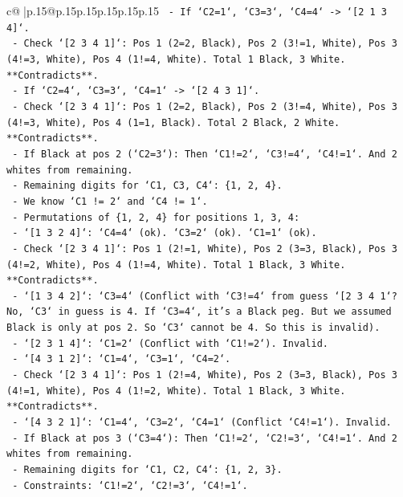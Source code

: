 \documentclass{article}
\begin{document}
{\begin{supertabular}{c@{$\;$}|p{.15\linewidth}@{}p{.15\linewidth}p{.15\linewidth}p{.15\linewidth}p{.15\linewidth}p{.15\linewidth}}
{{{\texttt{      {-} If `C2=1`, `C3=3`, `C4=4` {-}> `{[}2 1 3 4{]}`.} \\
\texttt{        {-} Check `{[}2 3 4 1{]}`: Pos 1 (2=2, Black), Pos 2 (3!=1, White), Pos 3 (4!=3, White), Pos 4 (1!=4, White). Total 1 Black, 3 White. **Contradicts**.} \\
\texttt{      {-} If `C2=4`, `C3=3`, `C4=1` {-}> `{[}2 4 3 1{]}`.} \\
\texttt{        {-} Check `{[}2 3 4 1{]}`: Pos 1 (2=2, Black), Pos 2 (3!=4, White), Pos 3 (4!=3, White), Pos 4 (1=1, Black). Total 2 Black, 2 White. **Contradicts**.} \\
\texttt{    {-} If Black at pos 2 (`C2=3`): Then `C1!=2`, `C3!=4`, `C4!=1`. And 2 whites from remaining.} \\
\texttt{      {-} Remaining digits for `C1, C3, C4`: \{1, 2, 4\}.} \\
\texttt{      {-} We know `C1 != 2` and `C4 != 1`.} \\
\texttt{      {-} Permutations of \{1, 2, 4\} for positions 1, 3, 4:} \\
\texttt{        {-} `{[}1 3 2 4{]}`: `C4=4` (ok). `C3=2` (ok). `C1=1` (ok).} \\
\texttt{          {-} Check `{[}2 3 4 1{]}`: Pos 1 (2!=1, White), Pos 2 (3=3, Black), Pos 3 (4!=2, White), Pos 4 (1!=4, White). Total 1 Black, 3 White. **Contradicts**.} \\
\texttt{        {-} `{[}1 3 4 2{]}`: `C3=4` (Conflict with `C3!=4` from guess `{[}2 3 4 1`? No, `C3` in guess is 4. If `C3=4`, it's a Black peg. But we assumed Black is only at pos 2. So `C3` cannot be 4. So this is invalid).} \\
\texttt{        {-} `{[}2 3 1 4{]}`: `C1=2` (Conflict with `C1!=2`). Invalid.} \\
\texttt{        {-} `{[}4 3 1 2{]}`: `C1=4`, `C3=1`, `C4=2`.} \\
\texttt{          {-} Check `{[}2 3 4 1{]}`: Pos 1 (2!=4, White), Pos 2 (3=3, Black), Pos 3 (4!=1, White), Pos 4 (1!=2, White). Total 1 Black, 3 White. **Contradicts**.} \\
\texttt{        {-} `{[}4 3 2 1{]}`: `C1=4`, `C3=2`, `C4=1` (Conflict `C4!=1`). Invalid.} \\
\texttt{    {-} If Black at pos 3 (`C3=4`): Then `C1!=2`, `C2!=3`, `C4!=1`. And 2 whites from remaining.} \\
\texttt{      {-} Remaining digits for `C1, C2, C4`: \{1, 2, 3\}.} \\
\texttt{      {-} Constraints: `C1!=2`, `C2!=3`, `C4!=1`.} \\
}}}
\end{supertabular}}
\end{document}
